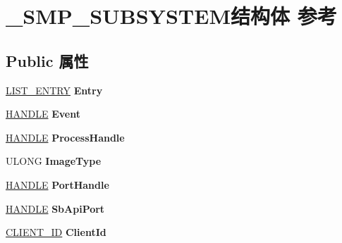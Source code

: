 \hypertarget{struct___s_m_p___s_u_b_s_y_s_t_e_m}{}\section{\+\_\+\+S\+M\+P\+\_\+\+S\+U\+B\+S\+Y\+S\+T\+E\+M结构体 参考}
\label{struct___s_m_p___s_u_b_s_y_s_t_e_m}
\subsection*{Public 属性}
\begin{DoxyCompactItemize}
\item 
\mbox{\label{struct___s_m_p___s_u_b_s_y_s_t_e_m_aa10ffbdb6e5997fe0ce83e22a0413b29}} 
\hyperlink{struct___l_i_s_t___e_n_t_r_y}{L\+I\+S\+T\+\_\+\+E\+N\+T\+RY} {\bfseries Entry}
\item 
\mbox{\label{struct___s_m_p___s_u_b_s_y_s_t_e_m_a644fa382e5fc5c65c83b689c8035d352}} 
\hyperlink{interfacevoid}{H\+A\+N\+D\+LE} {\bfseries Event}
\item 
\mbox{\label{struct___s_m_p___s_u_b_s_y_s_t_e_m_a429f783f09f045867ac62ca9abda70b4}} 
\hyperlink{interfacevoid}{H\+A\+N\+D\+LE} {\bfseries Process\+Handle}
\item 
\mbox{\label{struct___s_m_p___s_u_b_s_y_s_t_e_m_a7bcd701cf413a4654e355ce7d48d9e92}} 
U\+L\+O\+NG {\bfseries Image\+Type}
\item 
\mbox{\label{struct___s_m_p___s_u_b_s_y_s_t_e_m_aa89050cfa0d111fe73a09127e3d8427d}} 
\hyperlink{interfacevoid}{H\+A\+N\+D\+LE} {\bfseries Port\+Handle}
\item 
\mbox{\label{struct___s_m_p___s_u_b_s_y_s_t_e_m_a4918981659f7ab6a4a36191ca5ca8eca}} 
\hyperlink{interfacevoid}{H\+A\+N\+D\+LE} {\bfseries Sb\+Api\+Port}
\item 
\mbox{\label{struct___s_m_p___s_u_b_s_y_s_t_e_m_a608945288139afce87a35855bf65f84b}} 
\hyperlink{struct___c_l_i_e_n_t___i_d}{C\+L\+I\+E\+N\+T\+\_\+\+ID} {\bfseries Client\+Id}

\end{DoxyCompactItemize}

